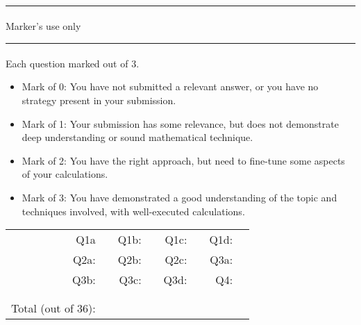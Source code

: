 \documentclass[a4paper, 11pt]{report}
\begin{document}
\hrule ${}^{}$\\
Marker's use only
\\
\hrule ${}^{}$\\
Each question marked out of 3.
\begin{itemize}
\item Mark of 0: You have not submitted a relevant answer, or you have no strategy present in your submission.\\
\item Mark of 1: Your submission has some relevance, but does not demonstrate deep understanding or sound mathematical technique. \\ %
\item Mark of 2: You have the right approach, but need to fine-tune some aspects of your calculations.\\
\item Mark of 3: You have demonstrated a good understanding of the topic and techniques involved, with well-executed calculations. \\ %
\end{itemize}
\begin{tabular}{rrrrrrrr}
Q1a & \hspace{2cm} & Q1b: & \hspace{2cm} & Q1c: & \hspace{2cm} & Q1d:  & \\[.5cm]
Q2a:& \hspace{2cm} & Q2b: & \hspace{2cm} & Q2c: & \hspace{2cm} & Q3a:  & \\[.5cm]
Q3b:& \hspace{2cm} & Q3c: & \hspace{2cm} & Q3d: & \hspace{2cm} & Q4:  & \\[.5cm]
& \hspace{2cm} &  & \hspace{2cm} & & \hspace{2cm} &  & \\[.5cm]
&&&&&&& \\
Total (out of 36): &&&&&&& \\
\end{tabular}
\end{document}
